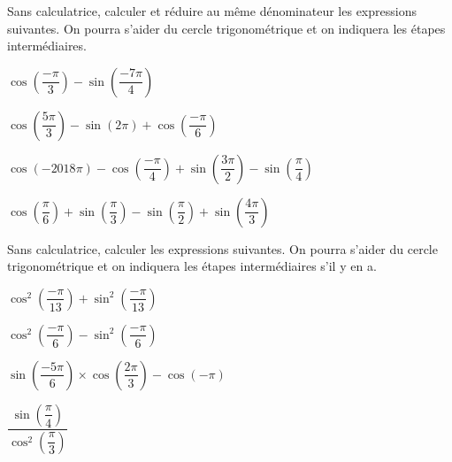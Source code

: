 \documentclass[11pt,a4paper]{article}  %
\begin{document}
\exercice{}

Sans calculatrice, calculer et réduire au même dénominateur les expressions suivantes. On pourra s'aider du cercle trigonométrique et on indiquera les étapes intermédiaires.
\begin{enumMet}
	\item $\cos \left(\dfrac{-\pi}{3}\right)-\sin \left(\dfrac{-7 \pi}{4}\right)$
	\item $\cos \left(\dfrac{5 \pi}{3}\right)-\sin (2 \pi)+\cos \left(\dfrac{-\pi}{6}\right)$
	\item $\cos (-2018 \pi)-\cos \left(\dfrac{-\pi}{4}\right)+\sin \left(\dfrac{3 \pi}{2}\right)-\sin \left(\dfrac{\pi}{4}\right)$
	\item $\cos \left(\dfrac{\pi}{6}\right)+\sin \left(\dfrac{\pi}{3}\right)-\sin \left(\dfrac{\pi}{2}\right)+\sin \left(\dfrac{4 \pi}{3}\right)$
\end{enumMet}

\exercice{}

Sans calculatrice, calculer les expressions suivantes. On pourra s'aider du cercle trigonométrique et on indiquera les étapes intermédiaires s'il y en a.
\begin{enumMet}
	\item $\cos ^2\left(\dfrac{-\pi}{13}\right)+\sin ^2\left(\dfrac{-\pi}{13}\right)$
	\item $\cos ^2\left(\dfrac{-\pi}{6}\right)-\sin ^2\left(\dfrac{-\pi}{6}\right)$
	\item $\sin \left(\dfrac{-5 \pi}{6}\right) \times \cos \left(\dfrac{2 \pi}{3}\right)-\cos (-\pi)$
	\item $\dfrac{\sin \left(\dfrac{\pi}{4}\right)}{\cos ^2\left(\dfrac{\pi}{3}\right)}$
\end{enumMet}
\end{document}
